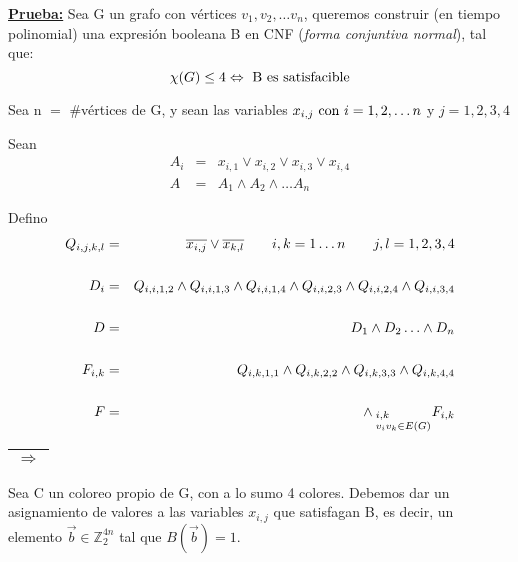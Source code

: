 \documentclass[12pt,a4paper]{report}
\begin{document}
		\textbf{\underline{Prueba:}} Sea G un grafo con vértices $v_{1}, v_{2}, \dotsc v_{n}$, queremos construir (en tiempo polinomial) una expresión booleana B en CNF (\textit{forma conjuntiva normal}), tal que:
			\[ \chi(G) \leq 4 \Leftrightarrow \textup{ B es satisfacible} \]
			\par Sea n $=$ \#vértices de G, y sean las variables $x_{i, j} \textup{ con } i = 1, 2, \dotsc n$ y $j = 1, 2, 3, 4$

			\vspace{3mm}
			\par Sean
			\begin{eqnarray}
				\nonumber A_{i} &=& x_{i, 1} \vee x_{i, 2} \vee x_{i, 3} \vee x_{i, 4}  \\
				\nonumber A &=& A_{1} \wedge A_{2} \wedge \dotsc A_{n}
			\end{eqnarray}

			\par Defino
			\begin{eqnarray}
				Q_{i, j, k, l} &=& \overline{x_{i, j}} \vee \overline{x_{k, l}}  \qquad i, k = 1 \dotsc n \qquad j, l = 1, 2, 3, 4 \\
				\nonumber \\
				D_{i} &=& Q_{i, i, 1, 2} \wedge Q_{i, i, 1, 3} \wedge Q_{i, i, 1, 4} \wedge Q_{i, i, 2, 3} \wedge Q_{i, i, 2, 4} \wedge Q_{i, i, 3, 4} \\
				\nonumber \\
				D &=& D_{1} \wedge D_{2} \dotsc \wedge D_{n} \\
				\nonumber \\
				F_{i, k} &=& Q_{i, k, 1, 1} \wedge Q_{i, k, 2, 2} \wedge Q_{i, k, 3, 3} \wedge Q_{i, k, 4, 4} \\
				\nonumber \\
				F &=& \wedge_{\begin{subarray}{l} \; i, k \\ \; v_{i} v_{k} \in E(G) \end{subarray}} F_{i, k}
			\end{eqnarray}

			\begin{tabular}{|c|} \hline $\Rightarrow$ \\ \hline \end{tabular}
				\vspace{3mm}

				\par Sea C un coloreo propio de G, con a lo sumo 4 colores. Debemos dar un asignamiento de valores a las variables $x_{i, j}$ que satisfagan B, es decir, un elemento $\overrightarrow{b} \in \mathbb{Z}^{4n}_{2}$ tal que $B(\overrightarrow{b}) = 1$.
\end{document}
